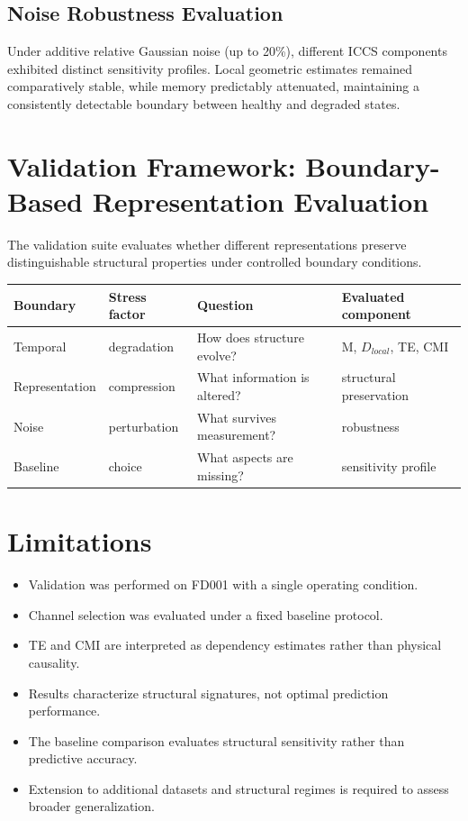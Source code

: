 \documentclass[11pt,a4paper]{article}
\begin{document}
\subsection{Noise Robustness Evaluation}
Under additive relative Gaussian noise (up to 20\%), different ICCS components exhibited distinct sensitivity profiles. Local geometric estimates remained comparatively stable, while memory predictably attenuated, maintaining a consistently detectable boundary between healthy and degraded states.

\section{Validation Framework: Boundary-Based Representation Evaluation}
The validation suite evaluates whether different representations preserve distinguishable structural properties under controlled boundary conditions.

\begin{table}[h]
\centering
\begin{tabular}{llll}
\toprule
\textbf{Boundary} & \textbf{Stress factor} & \textbf{Question} & \textbf{Evaluated component} \\
\midrule
Temporal & degradation & How does structure evolve? & M, $D_{local}$, TE, CMI \\
Representation & compression & What information is altered? & structural preservation \\
Noise & perturbation & What survives measurement? & robustness \\
Baseline & choice & What aspects are missing? & sensitivity profile \\
\bottomrule
\end{tabular}
\end{table}

\section*{Limitations}
\begin{itemize}
    \item Validation was performed on FD001 with a single operating condition.
    \item Channel selection was evaluated under a fixed baseline protocol.
    \item TE and CMI are interpreted as dependency estimates rather than physical causality.
    \item Results characterize structural signatures, not optimal prediction performance.
    \item The baseline comparison evaluates structural sensitivity rather than predictive accuracy.
    \item Extension to additional datasets and structural regimes is required to assess broader generalization.
\end{itemize}



\end{document}
